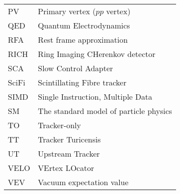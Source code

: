 \begin{supertabular}{ll}
    PV      & Primary vertex ($pp$ vertex) \\
    QED     & Quantum Electrodynamics \\
    RFA     & Rest frame approximation \\
    RICH    & Ring Imaging CHerenkov detector \\
    SCA     & Slow Control Adapter \\
    SciFi   & Scintillating Fibre tracker \\
    SIMD    & Single Instruction, Multiple Data \\
    SM      & The standard model of particle physics \\
    TO      & Tracker-only \\
    TT      & Tracker Turicensis \\
    UT      & Upstream Tracker \\
    VELO    & VErtex LOcator \\
    VEV     & Vacuum expectation value \\
\end{supertabular}
